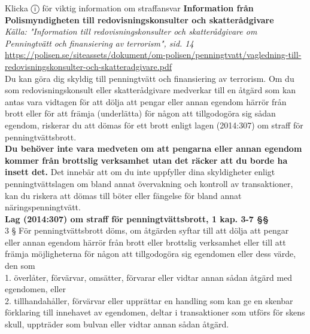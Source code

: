\documentclass[10pt]{beamer}
\begin{document}
\begin{alertblock}{Klicka ⓘ för viktig information om straffansvar}
  \tiny \textbf{Information från Polismyndigheten till redovisningskonsulter och skatterådgivare}\\
  \tiny \textit{Källa: "Information till redovisningskonsulter och skatterådgivare om Penningtvätt och finansiering av terrorism", sid. 14}\\[0.2cm]
  \tiny \url{https://polisen.se/siteassets/dokument/om-polisen/penningtvatt/vagledning-till-redovisningskonsulter-och-skatteradgivare.pdf}\\[0.2cm]
  
  \tiny Du kan göra dig skyldig till penningtvätt och finansiering av terrorism. 
  Om du som redovisningskonsult eller skatterådgivare medverkar till en åtgärd som 
  kan antas vara vidtagen för att dölja att pengar eller annan egendom härrör från 
  brott eller för att främja (underlätta) för någon att tillgodogöra sig sådan egendom, 
  riskerar du att dömas för ett brott enligt lagen (2014:307) om straff för penningtvättsbrott.\\
  
  \textbf{Du behöver inte vara medveten om att pengarna eller annan egendom kommer från 
  brottslig verksamhet utan det räcker att du borde ha insett det.} Det innebär att om 
  du inte uppfyller dina skyldigheter enligt penningtvättslagen om bland annat övervakning 
  och kontroll av transaktioner, kan du riskera att dömas till böter eller fängelse för 
  bland annat näringspenningtvätt.\\[0.2cm]

  \tiny \textbf{Lag (2014:307) om straff för penningtvättsbrott, 1 kap. 3-7 §§}\\

  \tiny 3 §   För penningtvättsbrott döms, om åtgärden syftar till att dölja att pengar eller annan 
  egendom härrör från brott eller brottslig verksamhet eller till att främja möjligheterna för 
  någon att tillgodogöra sig egendomen eller dess värde, den som\\
   \tiny 1. överlåter, förvärvar, omsätter, förvarar eller vidtar annan sådan åtgärd med egendomen, eller\\
   \tiny 2. tillhandahåller, förvärvar eller upprättar en handling som kan ge en skenbar förklaring till 
   innehavet av egendomen, deltar i transaktioner som utförs för skens skull, uppträder som bulvan 
   eller vidtar annan sådan åtgärd.\\


\end{alertblock}
\end{document}

